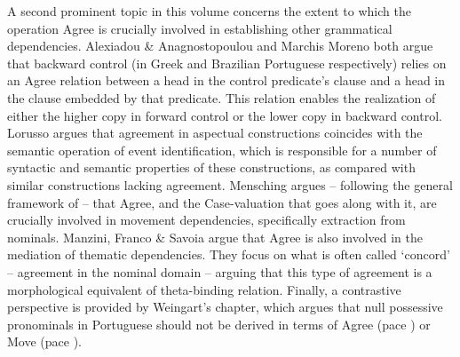 \documentclass[output=paper]{langsci/langscibook}
\begin{document}
A second prominent topic in this volume concerns the extent to which the operation Agree is crucially involved in establishing other grammatical dependencies. Alexiadou \& Anagnostopoulou and Marchis Moreno both argue that backward control (in Greek and Brazilian Portuguese respectively) relies on an Agree relation between a head in the control predicate’s clause and a head in the clause embedded by that predicate. This relation enables the realization of either the higher copy in forward control or the lower copy in backward control. Lorusso argues that agreement in aspectual constructions coincides with the semantic operation of event identification, which is responsible for a number of syntactic and semantic properties of these constructions, as compared with similar constructions lacking agreement. Mensching argues – following the general framework of \citet{Chomsky2000,Chomsky2001Derivation} – that Agree, and the Case-valuation that goes along with it, are crucially involved in movement dependencies, specifically extraction from nominals. Manzini, Franco \& Savoia argue that Agree is also involved in the mediation of thematic dependencies. They focus on what is often called ‘concord’ – agreement in the nominal domain – arguing that this type of agreement is a morphological equivalent of  theta-binding relation. Finally, a contrastive perspective is provided by Weingart’s chapter, which argues that null possessive pronominals in Portuguese should not be derived in terms of Agree (pace \citealt{Hicks2009}) or Move (pace \citealt{Floripi2009,Rodrigues2010}).
\end{document}
